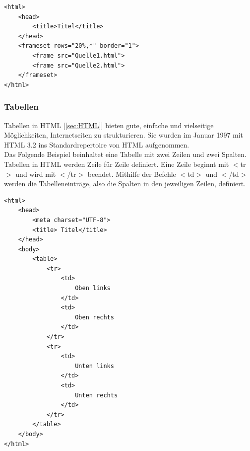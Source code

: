 \documentclass[12pt,a4paper,bibliography=totocnumbered,listof=totocnumbered]{scrartcl}
\begin{document}
\vspace{1em}
\begin{lstlisting}[caption= Beispiel für Frames in HTML, label=lst:HTML]
<html>
	<head>
		<title>Titel</title>
	</head>
	<frameset rows="20%,*" border="1">
		<frame src="Quelle1.html">
		<frame src="Quelle2.html">
	</frameset>
</html>
\end{lstlisting}

\subsubsection{Tabellen}
\label{sec:Tabellen}
Tabellen in HTML [\ref{sec:HTML}] bieten gute, einfache und vielseitige Möglichkeiten, Internetseiten zu strukturieren. Sie wurden im Januar 1997 mit HTML 3.2 ins Standardrepertoire von HTML aufgenommen.\cite{Hypertext_Markup_Language} \\
Das Folgende Beispiel beinhaltet eine Tabelle mit zwei Zeilen und zwei Spalten. Tabellen in HTML werden Zeile für Zeile definiert. Eine Zeile beginnt mit $<$tr$>$ und wird mit $<$/tr$>$ beendet. Mithilfe der Befehle $<$td$>$ und $<$/td$>$ werden die Tabelleneinträge, also die Spalten in den jeweiligen Zeilen, definiert.

\vspace{1em}
\begin{lstlisting}[caption= Beispiel für Tabellen in HTML, label=lst:HTML]
<html>
	<head>
		<meta charset="UTF-8">		
		<title> Titel</title>
	</head>
	<body>
		<table>
			<tr>
				<td>
					Oben links
				</td>
				<td>
					Oben rechts
				</td>
			</tr>
			<tr>
				<td>
					Unten links
				</td>
				<td>
					Unten rechts
				</td>
			</tr>
		</table>
	</body>
</html>
\end{lstlisting}
\end{document}
